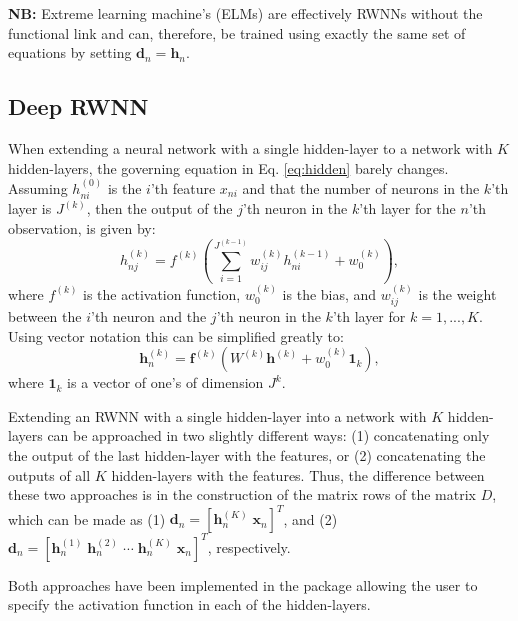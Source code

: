 \documentclass[
]{jss}
\begin{document}
\textbf{NB:} Extreme learning machine's (ELMs) are effectively RWNNs
without the functional link and can, therefore, be trained using exactly
the same set of equations by setting
\(\boldsymbol d_n = \boldsymbol h_n\).

\hypertarget{deep-rwnn}{%
\subsection{Deep RWNN}\label{deep-rwnn}}

When extending a neural network with a single hidden-layer to a network
with \(K\) hidden-layers, the governing equation in Eq.
\eqref{eq:hidden} barely changes. Assuming \(h_{ni}^{(0)}\) is the
\(i\)'th feature \(x_{ni}\) and that the number of neurons in the
\(k\)'th layer is \(J^{(k)}\), then the output of the \(j\)'th neuron in
the \(k\)'th layer for the \(n\)'th observation, is given by:
\begin{equation}
h_{nj}^{(k)} = f^{(k)}\left(\sum_{i = 1}^{J^{(k - 1)}} w^{(k)}_{ij} h_{ni}^{(k - 1)} + w^{(k)}_{0}\right), \label{eq:hidden2}
\end{equation} where \(f^{(k)}\) is the activation function,
\(w^{(k)}_0\) is the bias, and \(w^{(k)}_{ij}\) is the weight between
the \(i\)'th neuron and the \(j\)'th neuron in the \(k\)'th layer for
\(k = 1, ..., K\). Using vector notation this can be simplified greatly
to: \begin{equation}
\boldsymbol h_n^{(k)} = \boldsymbol f^{(k)}\left(W^{(k)} \boldsymbol{h}^{(k)} + w^{(k)}_0 \boldsymbol{1}_{k}\right),
\end{equation} where \(\boldsymbol{1}_k\) is a vector of one's of
dimension \(J^{k}\).

Extending an RWNN with a single hidden-layer into a network with \(K\)
hidden-layers can be approached in two slightly different ways: (1)
concatenating only the output of the last hidden-layer with the
features, or (2) concatenating the outputs of all \(K\) hidden-layers
with the features. Thus, the difference between these two approaches is
in the construction of the matrix rows of the matrix \(D\), which can be
made as (1)
\(\boldsymbol{d}_n = [\boldsymbol h_n^{(K)} \; \boldsymbol x_n]^T\), and
(2)
\(\boldsymbol{d}_n = [\boldsymbol h_n^{(1)} \; \boldsymbol h_n^{(2)} \; \cdots \; \boldsymbol h_n^{(K)} \; \boldsymbol x_n]^T\),
respectively.

Both approaches have been implemented in the  package allowing
the user to specify the activation function in each of the
hidden-layers.
\end{document}
